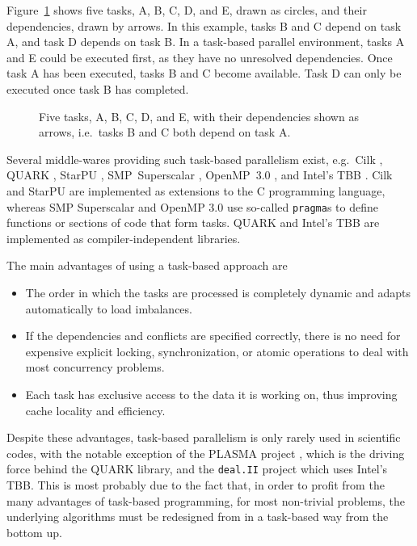 \documentclass[final]{siamltex}
\newcommand{\fig}[1]
    {Figure~\ref{fig:#1}}
\begin{document}
\fig{TasksExample} shows five tasks, A, B, C, D, and E, drawn
as circles, and their dependencies, drawn by arrows.
In this example, tasks B and C depend on task A, and task D
depends on task B.
In a task-based parallel environment, tasks A and E could
be executed first, as they have no unresolved dependencies.
Once task A has been executed, tasks B and C become available.
Task D can only be executed once task B has completed.

\begin{figure}
    \centerline{}
    
    \caption{Five tasks, A, B, C, D, and E, with their dependencies
        shown as arrows, i.e.~tasks B and C both depend on task A.}
    \label{fig:TasksExample}
\end{figure}

Several middle-wares providing such task-based
parallelism exist, e.g.~Cilk \cite{ref:Blumofe1995}, QUARK \cite{ref:QUARK},
StarPU \cite{ref:Augonnet2011}, SMP~Superscalar \cite{ref:SMPSuperscalar},
OpenMP~3.0 \cite{ref:Duran2009}, and Intel's TBB \cite{ref:Reinders2007}.
Cilk and StarPU are implemented as extensions to the C programming
language, whereas SMP Superscalar and OpenMP 3.0 use so-called {\tt pragma}s
to define functions or sections of code that form tasks.
QUARK and Intel's TBB are implemented as compiler-independent
libraries.

The main advantages of using a task-based approach are
%
\begin{itemize}
    \item The order in which the tasks are processed is completely
        dynamic and adapts automatically to load imbalances.
    \item If the dependencies and conflicts are specified correctly,
        there is no need for expensive explicit locking, synchronization,
        or atomic operations to deal with most concurrency problems.
    \item Each task has exclusive access to the data it is working on,
        thus improving cache locality and efficiency.
\end{itemize}
%
Despite these advantages, task-based parallelism is only rarely
used in scientific codes, with the notable exception of
the PLASMA project \cite{ref:Agullo2009}, which is the driving
force behind the QUARK library, and the {\tt deal.II} project
\cite{ref:Bangerth2007} which uses Intel's TBB.
This is most probably due to the fact that, in order to profit
from the many advantages of task-based programming,
for most non-trivial problems, the underlying algorithms must
be redesigned from in a task-based way from the bottom up.
\end{document}

